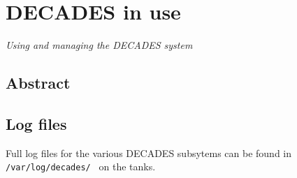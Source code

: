 

\chapter{DECADES in use}
\begin{center}
{\small\em Using and managing the DECADES system}
\end{center}

\section{Abstract}

\section{Log files}
Full log files for the various DECADES subsytems can be found in {\tt /var/log/decades/ } on the tanks.
\newpage
